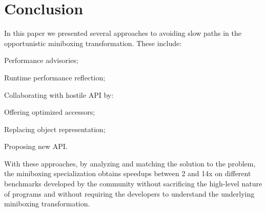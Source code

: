 \section{Conclusion}

In this paper we presented several approaches to avoiding slow paths in the opportunistic miniboxing transformation. These include:

\begin{compactitem}
  \item Performance advisories;
  \item Runtime performance reflection;
  \item Collaborating with hostile API by:
  \begin{compactitem}
    \item Offering optimized accessors;
    \item Replacing object representation;
    \item Proposing new API.
  \end{compactitem}
\end{compactitem}

With these approaches, by analyzing and matching the solution to the problem, the miniboxing specialization obtains speedups between 2 and 14x on different benchmarks developed by the community without sacrificing the high-level nature of programs and without requiring the developers to understand the underlying miniboxing transformation.